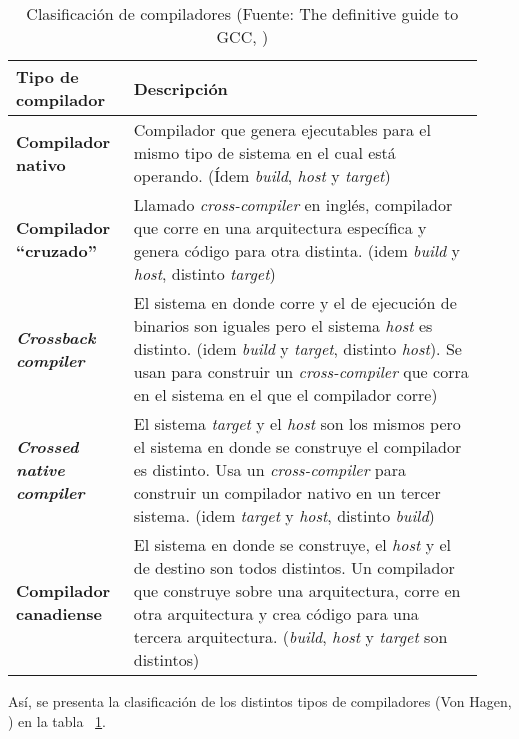     \begin{table}[t]
        \centering
            \caption{Clasificación de compiladores (Fuente: The definitive guide to \ac{GCC}, \cite{von_hagen_definitive_2006}) }
            \label{tab:TiposCompiladores}
            \begin{tabular}{ | p{0.23\linewidth} | p{0.7\linewidth} | }
                \hline
                \textbf{Tipo de compilador}  & \textbf{Descripción}  \\ \hline
                \textbf{Compilador nativo}  & Compilador que genera  ejecutables para el mismo tipo de sistema en  el cual está operando. (Ídem \emph{build}, \emph{host} y \emph{target})  \\ \hline
                \raggedright \textbf{Compilador “cruzado”}  & Llamado \emph{cross-compiler} en inglés, compilador que corre en una arquitectura específica y genera código para otra distinta. (idem \emph{build} y \emph{host}, distinto \emph{target})   \\ \hline
                \textbf{\emph{Crossback compiler}}    & El sistema en donde corre y el de ejecución de binarios son iguales pero el sistema \emph{host} es distinto. (idem \emph{build} y \emph{target}, distinto \emph{host}).  Se usan para construir un \emph{cross-compiler} que corra en el sistema en el que el compilador corre)  \\ \hline
                \textbf{\emph{Crossed native compiler}}    & El sistema \emph{target} y el \emph{host} son los mismos pero el sistema en donde se construye el compilador es distinto. Usa un \emph{cross-compiler} para construir un compilador nativo en un tercer sistema. (idem \emph{target} y \emph{host}, distinto \emph{build})  \\ \hline
                \raggedright \textbf{Compilador canadiense}    &   El sistema en donde se construye, el \emph{host} y el de destino son todos distintos. Un compilador que construye sobre una arquitectura, corre en otra arquitectura y crea código para una tercera arquitectura. (\emph{build}, \emph{host} y \emph{target} son distintos)   \\ \hline
            \end{tabular}
        \par
    \end{table}

    Así, se presenta la clasificación de los distintos tipos de compiladores (Von Hagen, \cite{von_hagen_definitive_2006}) en la tabla ~\ref{tab:TiposCompiladores}.

